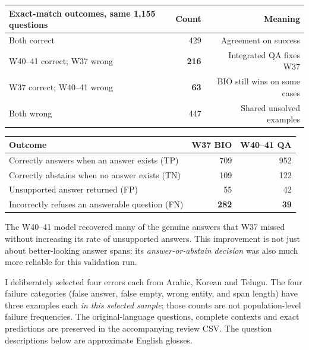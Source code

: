 \documentclass[10pt,a4paper]{article}
\newcommand{\sectionline}[1]{\vspace{5pt}{\large\bfseries #1}\par\vspace{1pt}}
\begin{document}
\begin{center}
\begin{tabular}{@{}lrr@{}}
\toprule
Exact-match outcomes, same 1,155 questions & Count & Meaning\\
\midrule
Both correct & 429 & Agreement on success\\
W40--41 correct; W37 wrong & \textbf{216} & Integrated QA fixes W37\\
W37 correct; W40--41 wrong & \textbf{63} & BIO still wins on some cases\\
Both wrong & 447 & Shared unsolved examples\\
\bottomrule
\end{tabular}
\end{center}

\sectionline{3. Answerability: where the biggest gain came from}
\begin{center}
\begin{tabular}{@{}lrr@{}}
\toprule
Outcome & W37 BIO & W40--41 QA\\
\midrule
Correctly answers when an answer exists (TP) & 709 & 952\\
Correctly abstains when no answer exists (TN) & 109 & 122\\
Unsupported answer returned (FP) & 55 & 42\\
Incorrectly refuses an answerable question (FN) & \textbf{282} & \textbf{39}\\
\bottomrule
\end{tabular}
\end{center}

The W40--41 model recovered many of the genuine answers that W37 missed without increasing its rate of unsupported answers. This improvement is not just about better-looking answer spans: its \emph{answer-or-abstain decision} was also much more reliable for this validation run.

\newpage
\sectionline{4. Manual error analysis: 12 W40--41 errors}
I deliberately selected four errors each from Arabic, Korean and Telugu. The four failure categories (false answer, false empty, wrong entity, and span length) have three examples each \emph{in this selected sample}; those counts are not population-level failure frequencies. The original-language questions, complete contexts and exact predictions are preserved in the accompanying review CSV. The question descriptions below are approximate English glosses.
\end{document}

